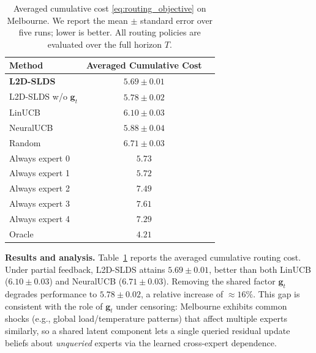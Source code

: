 \begin{table}[ht]
\centering
\small
\setlength{\tabcolsep}{4pt}
\caption{Averaged cumulative cost \eqref{eq:routing_objective} on Melbourne.
We report the mean $\pm$ standard error over five runs; lower is better.
All routing policies are evaluated over the full horizon \(T\).}
\label{tab:exp_avg_costs_melbourne}
\begin{tabular}{@{}lcc@{}}
\toprule
Method & Averaged Cumulative Cost  \\
\midrule
\textbf{L2D-SLDS} & \(\mathbf{5.69 \pm 0.01}\)  \\
L2D-SLDS w/o \(\mathbf{g}_t\) & \(5.78 \pm 0.02\) \\
\midrule
LinUCB & \(6.10 \pm 0.03\)  \\
NeuralUCB & \(5.88 \pm 0.04\)  \\
Random & \(6.71 \pm 0.03\)  \\
Always expert 0 & \(5.73\)  \\
Always expert 1 & \(5.72\) \\
Always expert 2 & \(7.49\) \\
Always expert 3 & \(7.61\) \\
Always expert 4 & \(7.29\)  \\
Oracle & \(4.21\)  \\
\bottomrule
\end{tabular}
\end{table}

\textbf{Results and analysis.}
Table~\ref{tab:exp_avg_costs_melbourne} reports the averaged cumulative routing cost. Under partial feedback, L2D-SLDS attains
\(5.69 \pm 0.01\), better than both LinUCB (\(6.10 \pm 0.03\)) and NeuralUCB (\(6.71 \pm 0.03\)). Removing the shared factor
\(\mathbf{g}_t\) degrades performance to \(5.78 \pm 0.02\), a relative increase of \(\approx 16\%\).
This gap is consistent with the role of \(\mathbf{g}_t\) under censoring: Melbourne exhibits common shocks (e.g., global
load/temperature patterns) that affect multiple experts similarly, so a shared latent component lets a single queried residual
update beliefs about \emph{unqueried} experts via the learned cross-expert dependence.


